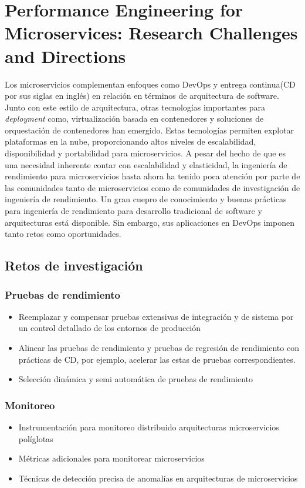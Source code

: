 \section{Performance Engineering for Microservices: Research Challenges and Directions\cite{microservices-challenges}}
Los microservicios complementan enfoques como DevOps y entrega continua(CD por sus siglas en inglés) en relación en términos de arquitectura de software. Junto con este estilo de arquitectura, otras tecnologías importantes para \emph{deployment} como, virtualización basada en contenedores y soluciones de orquestación de contenedores han emergido. Estas tecnologías permiten explotar plataformas en la nube, proporcionando altos niveles de escalabilidad, disponibilidad y portabilidad para microservicios. A pesar del hecho de que es una necesidad inherente contar con escalabilidad y elasticidad, la ingeniería de rendimiento para microservicios hasta ahora ha tenido poca atención por parte de las comunidades tanto de microservicios como de comunidades de investigación de ingeniería de rendimiento. Un gran cuepro de conocimiento y buenas prácticas para ingeniería de rendimiento para desarrollo tradicional de software y arquitecturas está disponible. Sin embargo, sus aplicaciones en DevOps imponen tanto retos como oportunidades.

\subsection{Retos de investigación}

\subsubsection{Pruebas de rendimiento}
\begin{itemize}
    \item Reemplazar y compensar pruebas extensivas de integración y de sistema por un control detallado de los entornos de producción
    \item Alinear las pruebas de rendimiento y pruebas de regresión de rendimiento con prácticas de CD, por ejemplo, acelerar las estas de pruebas correspondientes.
    \item Selección dinámica y semi automática de pruebas de rendimiento
\end{itemize}

\subsubsection{Monitoreo}
\begin{itemize}
    \item Instrumentación para monitoreo distribuido arquitecturas microservicios políglotas 
    \item Métricas adicionales para monitorear microservicios
    \item Técnicas de detección precisa de anomalías en arquitecturas de microservicios
\end{itemize}


